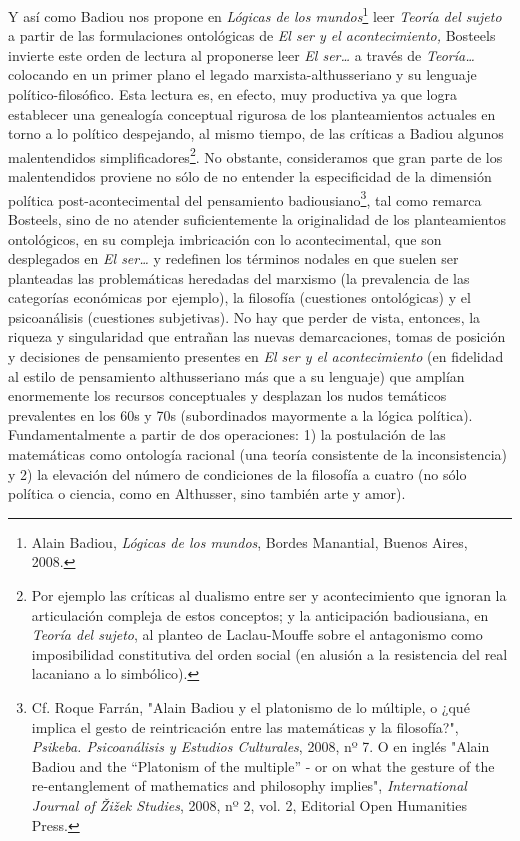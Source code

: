 \documentclass{book}
\begin{document}
Y así como Badiou nos propone en \emph{Lógicas de los mundos}\footnote{Alain
  Badiou, \emph{Lógicas de los mundos}, Bordes Manantial, Buenos Aires,
  2008.} leer \emph{Teoría del sujeto} a partir de las formulaciones
ontológicas de \emph{El ser y el acontecimiento,} Bosteels invierte este
orden de lectura al proponerse leer \emph{El ser\ldots{}} a través de
\emph{Teoría\ldots{}} colocando en un primer plano el legado
marxista-althusseriano y su lenguaje político-filosófico. Esta lectura
es, en efecto, muy productiva ya que logra establecer una genealogía
conceptual rigurosa de los planteamientos actuales en torno a lo
político despejando, al mismo tiempo, de las críticas a Badiou algunos
malentendidos simplificadores\footnote{Por ejemplo las críticas al
  dualismo entre ser y acontecimiento que ignoran la articulación
  compleja de estos conceptos; y la anticipación badiousiana, en
  \emph{Teoría del sujeto}, al planteo de Laclau-Mouffe sobre el
  antagonismo como imposibilidad constitutiva del orden social (en
  alusión a la resistencia del real lacaniano a lo simbólico).}. No
obstante, consideramos que gran parte de los malentendidos proviene no
sólo de no entender la especificidad de la dimensión política
post-acontecimental del pensamiento badiousiano\footnote{Cf. Roque
  Farrán, "Alain Badiou y el platonismo de lo múltiple, o ¿qué implica
  el gesto de reintricación entre las matemáticas y la filosofía?",
  \emph{Psikeba. Psicoanálisis y Estudios Culturales}, 2008, nº 7. O en
  inglés "Alain Badiou and the ``Platonism of the multiple'' - or on
  what the gesture of the re-entanglement of mathematics and philosophy
  implies", \emph{International Journal of Žižek Studies}, 2008, nº 2,
  vol. 2, Editorial Open Humanities Press.}, tal como remarca Bosteels,
sino de no atender suficientemente la originalidad de los planteamientos
ontológicos, en su compleja imbricación con lo acontecimental, que son
desplegados en \emph{El ser\ldots{}} y redefinen los términos nodales en
que suelen ser planteadas las problemáticas heredadas del marxismo (la
prevalencia de las categorías económicas por ejemplo), la filosofía
(cuestiones ontológicas) y el psicoanálisis (cuestiones subjetivas). No
hay que perder de vista, entonces, la riqueza y singularidad que
entrañan las nuevas demarcaciones, tomas de posición y decisiones de
pensamiento presentes en \emph{El ser y el acontecimiento} (en fidelidad
al estilo de pensamiento althusseriano más que a su lenguaje) que
amplían enormemente los recursos conceptuales y desplazan los nudos
temáticos prevalentes en los 60s y 70s (subordinados mayormente a la
lógica política). Fundamentalmente a partir de dos operaciones: 1) la
postulación de las matemáticas como ontología racional (una teoría
consistente de la inconsistencia) y 2) la elevación del número de
condiciones de la filosofía a cuatro (no sólo política o ciencia, como
en Althusser, sino también arte y amor).
\end{document}
